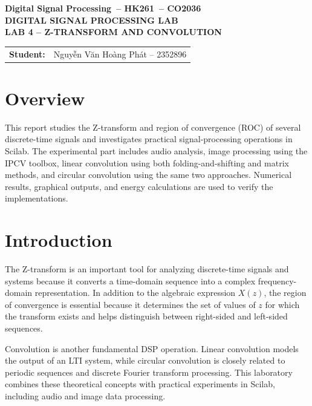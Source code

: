 \documentclass[12pt,a4paper]{article}
\newcommand{\coursename}{Digital Signal Processing}
\newcommand{\coursecode}{CO2036}
\newcommand{\semester}{HK261}
\newcommand{\labtitle}{LAB 4 -- Z-TRANSFORM AND CONVOLUTION}
\newcommand{\studentone}{Nguyễn Văn Hoàng Phát -- 2352896}
\begin{document}
\begin{center}
    {\large \textbf{\coursename\ -- \semester\ -- \coursecode}}\\[1.2cm]

    {\LARGE \textbf{DIGITAL SIGNAL PROCESSING LAB}}\\[1cm]
    {\Large \textbf{\labtitle}}\\[1.5cm]

    \begin{tabular}{>{\bfseries}l l}
        Student: & \studentone \\
    \end{tabular}
\end{center}

\vspace{1.2cm}

\section*{Overview}
This report studies the Z-transform and region of convergence (ROC) of
several discrete-time signals and investigates practical signal-processing
operations in Scilab. The experimental part includes audio analysis,
image processing using the IPCV toolbox, linear convolution using both
folding-and-shifting and matrix methods, and circular convolution using
the same two approaches. Numerical results, graphical outputs, and
energy calculations are used to verify the implementations.

\tableofcontents
\newpage

\section{Introduction}
The Z-transform is an important tool for analyzing discrete-time signals
and systems because it converts a time-domain sequence into a complex
frequency-domain representation. In addition to the algebraic expression
$X(z)$, the region of convergence is essential because it determines the
set of values of $z$ for which the transform exists and helps distinguish
between right-sided and left-sided sequences.

Convolution is another fundamental DSP operation. Linear convolution
models the output of an LTI system, while circular convolution is closely
related to periodic sequences and discrete Fourier transform processing.
This laboratory combines these theoretical concepts with practical
experiments in Scilab, including audio and image data processing.
\end{document}
